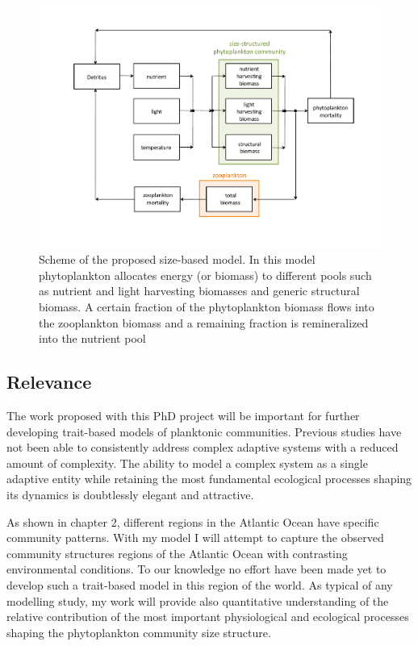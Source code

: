 \begin{figure}
\centering
\includegraphics[trim = 15mm 50mm 15mm 25mm, clip, width=1\linewidth]{./Chp3-Further/model-scheme.pdf}
\caption[Scheme]{\small {Scheme of the proposed size-based model. In this model phytoplankton allocates energy (or biomass) to different pools such as nutrient and light harvesting biomasses and generic structural biomass. A certain fraction of the phytoplankton biomass flows into the zooplankton biomass and a remaining fraction is remineralized into the nutrient pool}}
\label{model}
\end{figure}

\subsection{Relevance}
The work proposed with this PhD project will be important for further developing trait-based models of planktonic communities. Previous studies have not been able to consistently address complex adaptive systems with a reduced amount of complexity. The ability to model a complex system as a single adaptive entity while retaining the most fundamental ecological processes shaping its dynamics is doubtlessly elegant and attractive. 

As shown in chapter 2, different regions in the Atlantic Ocean have specific community patterns. With my model I will attempt to capture the observed community structures regions of the Atlantic Ocean with contrasting environmental conditions. To our knowledge no effort have been made yet to develop such a trait-based model in this region of the world. As typical of any modelling study, my work will provide also quantitative understanding of the relative contribution of the most important physiological and ecological processes shaping the phytoplankton community size structure. 

